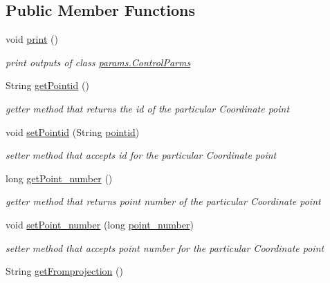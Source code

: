 \subsection*{Public Member Functions}
\begin{DoxyCompactItemize}
\item 
void \hyperlink{classparams_1_1_control_parms_af1a625fc2adabd5ec8a2af31f93d3278}{print} ()
\begin{DoxyCompactList}\small\item\em print outputs of class \hyperlink{classparams_1_1_control_parms}{params.\+Control\+Parms} \end{DoxyCompactList}\item 
String \hyperlink{classparams_1_1_control_parms_a0a9e4c1b1507109c2af9362c76f152b5}{get\+Pointid} ()
\begin{DoxyCompactList}\small\item\em getter method that returns the id of the particular Coordinate point \end{DoxyCompactList}\item 
void \hyperlink{classparams_1_1_control_parms_a801da8ace900553603da73d988c16ea6}{set\+Pointid} (String \hyperlink{classparams_1_1_control_parms_aa4531a579e0d7ae5f07853ac5f4141a2}{pointid})
\begin{DoxyCompactList}\small\item\em setter method that accepts id for the particular Coordinate point \end{DoxyCompactList}\item 
long \hyperlink{classparams_1_1_control_parms_a4849978cd3cad0b731e744d16ff90c97}{get\+Point\+\_\+number} ()
\begin{DoxyCompactList}\small\item\em getter method that returns point number of the particular Coordinate point \end{DoxyCompactList}\item 
void \hyperlink{classparams_1_1_control_parms_a28dd663a60ecea831af1955e43155f49}{set\+Point\+\_\+number} (long \hyperlink{classparams_1_1_control_parms_a3af78a8732b0695526059f88e10d7e9e}{point\+\_\+number})
\begin{DoxyCompactList}\small\item\em setter method that accepts point number for the particular Coordinate point \end{DoxyCompactList}\item 
String \hyperlink{classparams_1_1_control_parms_a040d46279514db25122b3230087da9cc}{get\+Fromprojection} ()

\end{DoxyCompactItemize}
